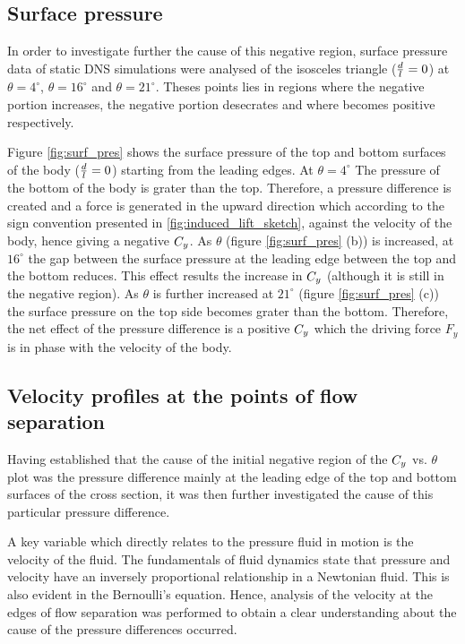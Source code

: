 \subsection{Surface pressure}
  \label{subsec:cross-sec-surface pressure}
  

In order to investigate further the cause of this negative region, surface pressure data of static DNS simulations were analysed of the isosceles triangle ($\frac{d}{l}=0$) at $\theta=4^{\circ}$, $\theta=16^{\circ}$ and $\theta=21^{\circ}$. Theses points lies in regions where the negative portion increases, the negative portion desecrates and where \cy becomes positive respectively.   
  


Figure \ref{fig:surf_pres} shows the surface pressure of the top and bottom surfaces of the body ($\frac{d}{l}=0$) starting from  the leading edges. At $\theta=4^{\circ}$ The pressure of the bottom of the body is grater than the top. Therefore, a pressure difference is created and a force is generated in the upward direction which according to the sign convention presented in \ref{fig:induced_lift_sketch}, against the velocity of the body, hence giving a negative $C_{y}$. As $\theta$ (figure \ref{fig:surf_pres} (b)) is increased, at $16^{\circ}$ the gap between the surface pressure at the leading edge between the top and the bottom reduces. This effect results the increase in $C_{y}$ (although it is still in the negative region). As $\theta$ is further increased at $21^{\circ}$ (figure \ref{fig:surf_pres} (c)) the surface pressure on the top side becomes grater than the bottom. Therefore, the net effect of the pressure difference is a positive $C_{y}$ which the driving force $F_y$ is in phase with the velocity of the body. 

\subsection{Velocity profiles at the points of flow separation}

Having established that the cause of the initial negative region of the $C_{y}$ vs. $\theta$ plot was the pressure difference mainly at the leading edge of the top and bottom surfaces of the cross section, it was then further investigated the cause of this particular pressure difference.  


A key variable which directly relates to the pressure fluid in motion is the velocity of the fluid. The fundamentals of fluid dynamics state that pressure and velocity have an inversely proportional relationship in a Newtonian fluid. This is also evident in the Bernoulli's equation. Hence, analysis of the velocity at the edges of flow separation was performed to obtain a clear understanding about the cause of the pressure differences occurred.   


